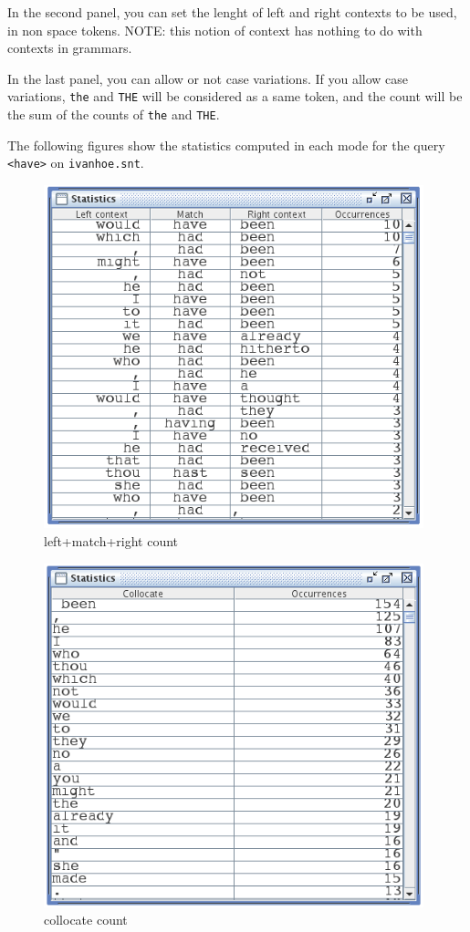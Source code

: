 \bigskip
\noindent In the second panel, you can set the lenght of left and right
contexts to be used, in non space tokens. NOTE: this notion of context has
nothing to do with contexts in grammars.

\bigskip
\noindent In the last panel, you can allow or not case variations. If you allow
case variations, \verb$the$ and \verb$THE$ will be considered as a same token,
and the count will be the sum of the counts of \verb$the$ and \verb$THE$.

\bigskip
\noindent The following figures show the statistics computed in each mode for
the query \verb$<have>$ on \verb$ivanhoe.snt$.


\bigskip
\begin{figure}[!h]
\begin{center}
\includegraphics[width=11cm]{resources/img/fig4-10.png}
\caption{left+match+right count\label{fig-statistics-mode0}}
\end{center}
\end{figure}

\begin{figure}[!h]
\begin{center}
\includegraphics[width=11cm]{resources/img/fig4-11.png}
\caption{collocate count\label{fig-statistics-mode1}}
\end{center}
\end{figure}

